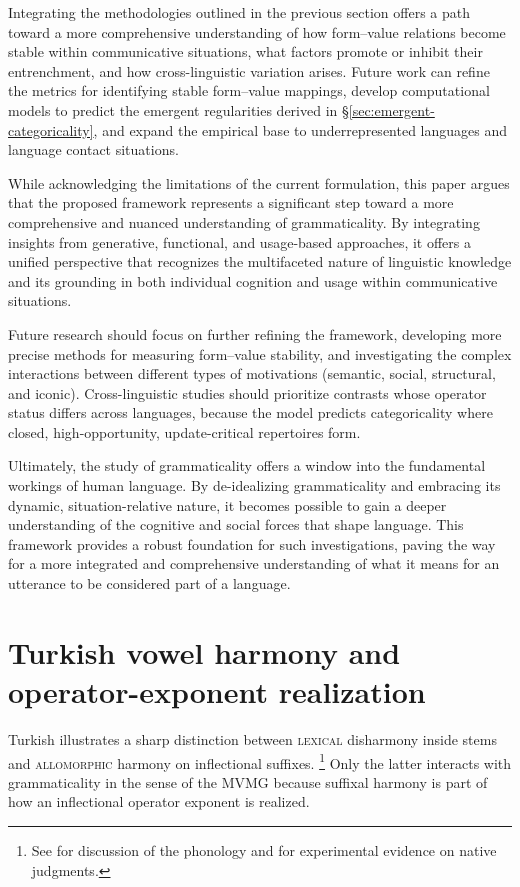 \documentclass[12pt,letterpaper]{article}
\newcommand{\term}[1]{\textsc{#1}}
\begin{document}
Integrating the methodologies outlined in the previous section offers a path toward a more comprehensive understanding of how form--value relations become stable within communicative situations, what factors promote or inhibit their entrenchment, and how cross-linguistic variation arises. Future work can refine the metrics for identifying stable form--value mappings, develop computational models to predict the emergent regularities derived in \S\ref{sec:emergent-categoricality}, and expand the empirical base to underrepresented languages and language contact situations.

While acknowledging the limitations of the current formulation, this paper argues that the proposed framework represents a significant step toward a more comprehensive and nuanced understanding of grammaticality. By integrating insights from generative, functional, and usage-based approaches, it offers a unified perspective that recognizes the multifaceted nature of linguistic knowledge and its grounding in both individual cognition and usage within communicative situations.

Future research should focus on further refining the framework, developing more precise methods for measuring form--value stability, and investigating the complex interactions between different types of motivations (semantic, social, structural, and iconic). Cross-linguistic studies should prioritize contrasts whose operator status differs across languages, because the model predicts categoricality where closed, high-opportunity, update-critical repertoires form.

Ultimately, the study of grammaticality offers a window into the fundamental workings of human language. By de-idealizing grammaticality and embracing its dynamic, situation-relative nature, it becomes possible to gain a deeper understanding of the cognitive and social forces that shape language. This framework provides a robust foundation for such investigations, paving the way for a more integrated and comprehensive understanding of what it means for an utterance to be considered part of a language.

\newpage
\appendix

\section{Turkish vowel harmony and operator-exponent realization}
\label{app:turkish-harmony}

Turkish illustrates a sharp distinction between \term{lexical} disharmony inside stems and
\term{allomorphic} harmony on inflectional suffixes.%
\footnote{See \autocite{Sezer1981,KabakVogel2001} for discussion of the phonology and \autocite{Arik2015} for experimental evidence on native judgments.} 
Only the latter interacts with grammaticality in the sense of the MVMG because
suffixal harmony is part of how an inflectional operator exponent is realized.
\end{document}
